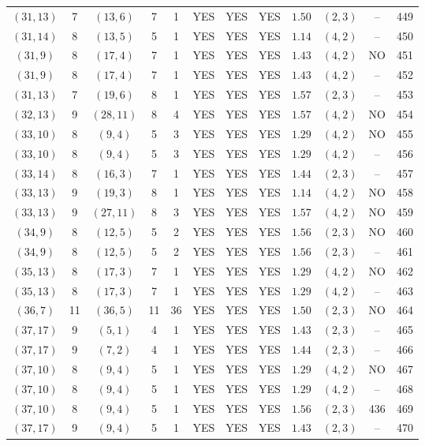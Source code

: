 \begin{longtable}{|c|c|c|c|c|c|c|c|c|c|c|c|}
$(31,13)$ & 7 & $(13,6)$ & 7 & 1 & YES & YES & YES & $1.50$ & $(2,3)$ & -- & 449\\
$(31,14)$ & 8 & $(13,5)$ & 5 & 1 & YES & YES & YES & $1.14$ & $(4,2)$ & -- & 450\\
$(31,9)$ & 8 & $(17,4)$ & 7 & 1 & YES & YES & YES & $1.43$ & $(4,2)$ & NO & 451\\
$(31,9)$ & 8 & $(17,4)$ & 7 & 1 & YES & YES & YES & $1.43$ & $(4,2)$ & -- & 452\\
$(31,13)$ & 7 & $(19,6)$ & 8 & 1 & YES & YES & YES & $1.57$ & $(2,3)$ & -- & 453\\
$(32,13)$ & 9 & $(28,11)$ & 8 & 4 & YES & YES & YES & $1.57$ & $(4,2)$ & NO & 454\\
$(33,10)$ & 8 & $(9,4)$ & 5 & 3 & YES & YES & YES & $1.29$ & $(4,2)$ & NO & 455\\
$(33,10)$ & 8 & $(9,4)$ & 5 & 3 & YES & YES & YES & $1.29$ & $(4,2)$ & -- & 456\\
$(33,14)$ & 8 & $(16,3)$ & 7 & 1 & YES & YES & YES & $1.44$ & $(2,3)$ & -- & 457\\
$(33,13)$ & 9 & $(19,3)$ & 8 & 1 & YES & YES & YES & $1.14$ & $(4,2)$ & NO & 458\\
$(33,13)$ & 9 & $(27,11)$ & 8 & 3 & YES & YES & YES & $1.57$ & $(4,2)$ & NO & 459\\
$(34,9)$ & 8 & $(12,5)$ & 5 & 2 & YES & YES & YES & $1.56$ & $(2,3)$ & NO & 460\\
$(34,9)$ & 8 & $(12,5)$ & 5 & 2 & YES & YES & YES & $1.56$ & $(2,3)$ & -- & 461\\
$(35,13)$ & 8 & $(17,3)$ & 7 & 1 & YES & YES & YES & $1.29$ & $(4,2)$ & NO & 462\\
$(35,13)$ & 8 & $(17,3)$ & 7 & 1 & YES & YES & YES & $1.29$ & $(4,2)$ & -- & 463\\
$(36,7)$ & 11 & $(36,5)$ & 11 & 36 & YES & YES & YES & $1.50$ & $(2,3)$ & NO & 464\\
$(37,17)$ & 9 & $(5,1)$ & 4 & 1 & YES & YES & YES & $1.43$ & $(2,3)$ & -- & 465\\
$(37,17)$ & 9 & $(7,2)$ & 4 & 1 & YES & YES & YES & $1.44$ & $(2,3)$ & -- & 466\\
$(37,10)$ & 8 & $(9,4)$ & 5 & 1 & YES & YES & YES & $1.29$ & $(4,2)$ & NO & 467\\
$(37,10)$ & 8 & $(9,4)$ & 5 & 1 & YES & YES & YES & $1.29$ & $(4,2)$ & -- & 468\\
$(37,10)$ & 8 & $(9,4)$ & 5 & 1 & YES & YES & YES & $1.56$ & $(2,3)$ & 436 & 469\\
$(37,17)$ & 9 & $(9,4)$ & 5 & 1 & YES & YES & YES & $1.43$ & $(2,3)$ & -- & 470\\

\end{longtable}
